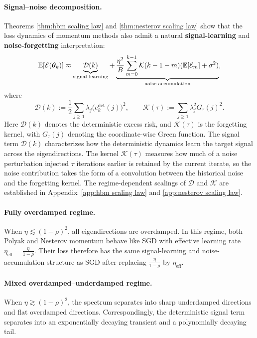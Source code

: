 \documentclass[11pt]{article}
\begin{document}
\paragraph{Signal--noise decomposition.}
Theorems \ref{thm:hbm scaling law} and \ref{thm:nesterov scaling law} show that the loss dynamics of momentum methods also admit a natural \textbf{signal-learning} and \textbf{noise-forgetting} interpretation:
\begin{equation}
\label{eq:momentum-signal-noise-convolution}
\mathbb{E}[\mathcal{E}(\bm{\theta}_k)]
\eqsim
\underbrace{\mathcal D(k)}_{\text{signal learning}}
+
\underbrace{
\frac{\eta^2}{B}
\sum_{m=0}^{k-1}
\mathcal K(k-1-m)
(\mathbb{E}[\mathcal{E}_m]
+\sigma^2)}_{\text{noise accumulation}},
\end{equation}
where
\[
\mathcal D(k)
:=
\frac12\sum_{j\geq1}\lambda_j
\bigl(e_{k}^{\mathrm{det}}(j)\bigr)^2,
\qquad
\mathcal K(\tau)
:=
\sum_{j\geq1}\lambda_j^2G_{\tau}(j)^2.
\]
Here $\mathcal D(k)$ denotes the deterministic excess risk, and $\mathcal K(\tau)$ is the forgetting kernel, with $G_{\tau}(j)$ denoting the coordinate-wise Green function. The signal term $\mathcal D(k)$ characterizes how the deterministic dynamics learn the target signal across the eigendirections. The kernel $\mathcal K(\tau)$ measures how much of a noise perturbation injected $\tau$ iterations earlier is retained by the current iterate, so the noise contribution takes the form of a convolution between the historical noise and the forgetting kernel. The regime-dependent scalings of $\mathcal D$ and $\mathcal K$ are established in Appendix~\ref{app:hbm scaling law} and \ref{app:nesterov scaling law}.

\paragraph{Fully overdamped regime.}
When \(\eta\lesssim(1-\rho)^2\), all eigendirections are overdamped. In this regime, both Polyak and Nesterov momentum behave like SGD with effective learning rate \(\eta_{\mathrm{eff}}=\frac{\eta}{1-\rho}\). Their loss therefore has the same signal-learning and noise-accumulation structure as SGD after replacing \(\frac{\eta}{1-\rho}\) by \(\eta_{\mathrm{eff}}\). 

\paragraph{Mixed overdamped--underdamped regime.}
When \(\eta\gtrsim(1-\rho)^2\), the spectrum separates into sharp underdamped directions and flat overdamped directions. Correspondingly, the deterministic signal term separates into an exponentially decaying transient and a polynomially decaying tail. 
\end{document}
